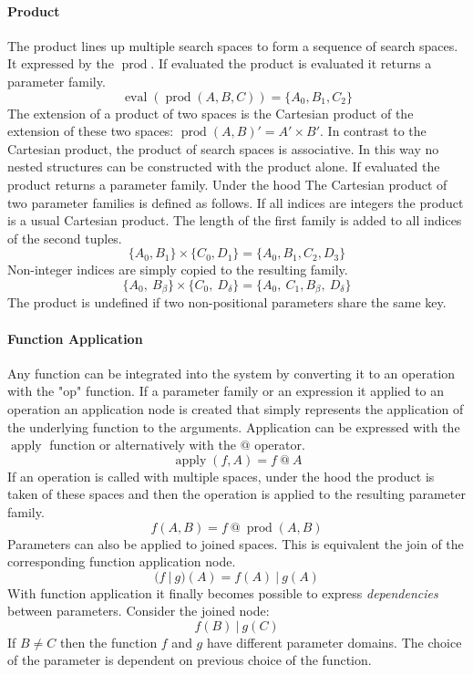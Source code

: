 \documentclass[english]{article}
\newcommand{\apply}{\operatorname{apply}}
\newcommand{\eval}{\operatorname{eval}}
\newcommand{\prot}{\operatorname{prod}}
\begin{document}
\paragraph{Product}
The product lines up multiple search spaces to form a sequence of search spaces. It expressed by the $\prot$. If evaluated the product is evaluated it returns a parameter family.
$$\eval(\prot(A, B, C)) = \{A_0, B_1, C_2\}$$
The extension of a product of two spaces is the Cartesian product of the extension of these two spaces: $\prot(A,B)' = A' \times B'$. In contrast to the Cartesian product, the product of search spaces is associative.  In this way no nested structures can be constructed with the product alone. If evaluated the product returns a parameter family. Under the hood
The Cartesian product of two parameter families is defined as follows. If all indices are integers the product is a usual Cartesian product. The length of the first family is added to all indices of the second tuples.
$$\{A_0, B_1\} \times \{C_0, D_1\} = \{A_0, B_1, C_2, D_3\}$$
Non-integer indices are simply copied to the resulting family.
$$\{A_0,\ B_\beta\} \times \{C_0,\ D_\delta\} = \{A_0,\ C_1, B_\beta,\ D_\delta\}$$
The product is undefined if two non-positional parameters share the same key.

\paragraph{Function Application}
Any function can be integrated into the system by converting it to an operation with the "op" function. If a parameter family or an expression it applied to an operation an application node is created that simply represents the application of the underlying function to the arguments. Application can be expressed with the $\apply$ function or alternatively with the $@$ operator.
$$\apply(f, A) = f\ @\ A$$
If an operation is called with multiple spaces, under the hood the product is taken of these spaces and then the operation is applied to the resulting parameter family.
$$f(A,B) = f\ @\ \prot(A,B)$$
Parameters can also be applied to joined spaces. This is equivalent the join of the corresponding function application node.
$$(f\ |\ g)(A) = f(A)\ |\ g(A)$$
With function application it finally becomes possible to express \textit{dependencies} between parameters. Consider the joined node:
$$f(B)\ |\ g(C)$$
If $B \neq C$ then the function $f$ and $g$ have different parameter domains. The choice of the parameter is dependent on previous choice of the function.
\end{document}
